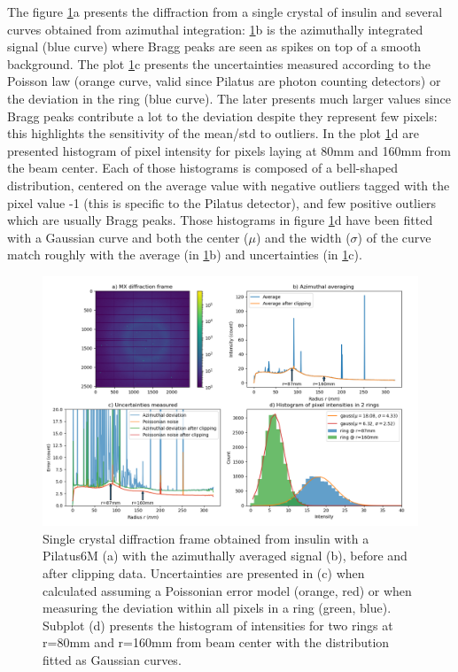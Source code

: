 \documentclass[preprint]{iucr}              %
\begin{document}
The figure \ref{fig1}a presents the diffraction from a single crystal of insulin and several curves obtained from azimuthal integration: 
\ref{fig1}b is the azimuthally integrated signal (blue curve) where Bragg peaks are seen as spikes on top of a smooth background.
The plot \ref{fig1}c presents the uncertainties measured according to the Poisson law (orange curve, valid since Pilatus are photon counting detectors) 
or the deviation in the ring (blue curve). 
The later presents much larger values since Bragg peaks contribute a lot to the deviation despite they represent few pixels: this highlights the sensitivity of the mean/std to outliers.
In the plot \ref{fig1}d are presented histogram of pixel intensity for pixels laying at 80mm and 160mm from the beam center. 
Each of those histograms is composed of a bell-shaped distribution, centered on the average value with negative outliers tagged with the pixel value -1 (this is specific to the Pilatus detector), and few positive outliers which are usually Bragg peaks.   
Those histograms in figure \ref{fig1}d have been fitted with a Gaussian curve and both the center ($\mu$) and the width ($\sigma$) of the curve match 
roughly with the average (in \ref{fig1}b) and uncertainties (in \ref{fig1}c).  
\begin{figure}
\label{fig1}
\begin{center}
\includegraphics[width=14cm]{fig1}
\caption{Single crystal diffraction frame obtained from insulin with a Pilatus6M (a) with the azimuthally averaged signal (b), 
before and after clipping data. Uncertainties are presented in (c) when calculated assuming a Poissonian error model (orange, red) or when measuring the deviation within all pixels in a ring (green, blue).
Subplot (d) presents the histogram of intensities for two rings at r=80mm and r=160mm from beam center with the distribution fitted as Gaussian curves.}
\end{center}
\end{figure}
\end{document}
